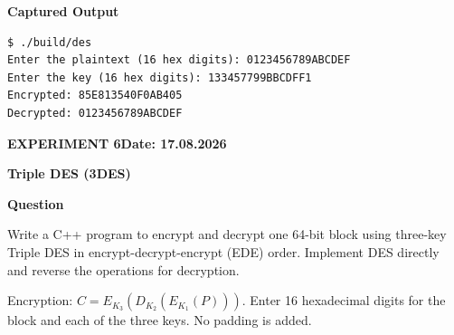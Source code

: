 \documentclass[11pt,a4paper]{article}
\newcommand{\blocktitle}[1]{\Needspace{6\baselineskip}\par\textbf{#1}\par}
\begin{document}
\par\begin{minipage}{\linewidth}
\textbf{Captured Output}\par
\begin{lstlisting}[style=terminal]
$ ./build/des
Enter the plaintext (16 hex digits): 0123456789ABCDEF
Enter the key (16 hex digits): 133457799BBCDFF1
Encrypted: 85E813540F0AB405
Decrypted: 0123456789ABCDEF
\end{lstlisting}
\end{minipage}

\clearpage
{}\label{exp:triple-des}
{\small\bfseries EXPERIMENT 6\hfill Date: 17.08.2026\par}
{\Large\bfseries Triple DES (3DES)\par}
\vspace{2mm}
\blocktitle{Question}
Write a C++ program to encrypt and decrypt one 64-bit block using three-key Triple DES in encrypt-decrypt-encrypt (EDE) order. Implement DES directly and reverse the operations for decryption.

Encryption: $C=E_{K_3}(D_{K_2}(E_{K_1}(P)))$. Enter 16 hexadecimal digits for the block and each of the three keys. No padding is added.
\end{document}

